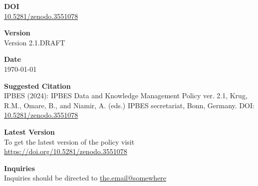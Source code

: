\begin{center}
    \vspace{1.5em}
    
    {\LARGE \textbf{DOI}} \\[0.5em]
    \href{https://doi.org/10.5281/zenodo.3551078}{10.5281/zenodo.3551078}
    
    \vspace{1.5em}
    
    {\LARGE \textbf{Version}} \\[0.5em]
    Version 2.1.DRAFT
    
    \vspace{1.5em}
    
    {\LARGE \textbf{Date}} \\[0.5em]
    \today
    
    \vspace{1.5em}
    
    {\LARGE \textbf{Suggested Citation}} \\[0.5em]
    IPBES (2024): IPBES Data and Knowledge Management Policy ver. 2.1, Krug, R.M., Omare, B., and Niamir, A. (eds.) IPBES secretariat, Bonn, Germany. DOI: \href{https://doi.org/10.5281/zenodo.3551078}{10.5281/zenodo.3551078}
    
    \vspace{1.5em}
    
    {\LARGE \textbf{Latest Version}} \\[0.5em]
    To get the latest version of the policy visit \href{https://doi.org/10.5281/zenodo.3551078}{https://doi.org/10.5281/zenodo.3551078}
    
    \vspace{1.5em}
    
    {\LARGE \textbf{Inquiries}} \\[0.5em]
    Inquiries should be directed to \href{mailto:the.email@somewhere}{the.email@somewhere}

\end{center}

\newpage
